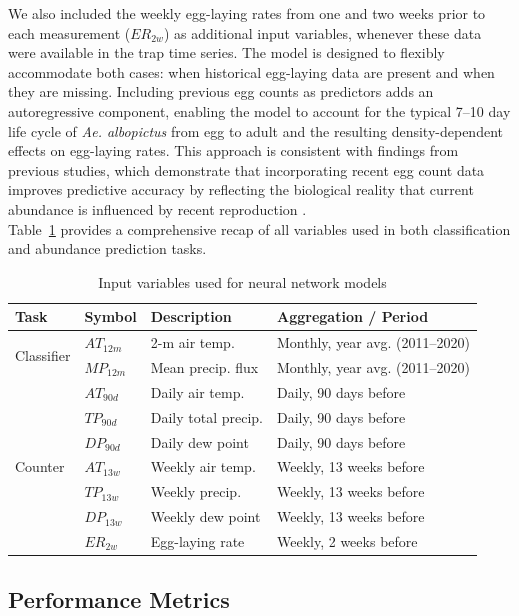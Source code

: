 \documentclass[preprint,12pt]{elsarticle}
\begin{document}
We also included the weekly egg-laying rates from one and two weeks prior to each measurement ($ER_{2w}$) as additional input variables, whenever these data were available in the trap time series. The model is designed to flexibly accommodate both cases: when historical egg-laying data are present and when they are missing. Including previous egg counts as predictors adds an autoregressive component, enabling the model to account for the typical 7–10 day life cycle of \emph{Ae. albopictus} from egg to adult \cite{CDC} and the resulting density-dependent effects on egg-laying rates. This approach is consistent with findings from previous studies, which demonstrate that incorporating recent egg count data improves predictive accuracy by reflecting the biological reality that current abundance is influenced by recent reproduction \cite{Steindorf2025}.\\
Table~\ref{tab:inputs_var} provides a comprehensive recap of all variables used in both classification and abundance prediction tasks.
\begin{table}[ht]
\centering
\begin{tabular}{|l|l|p{3cm}|p{6cm}|}
\hline
\textbf{Task} & \textbf{Symbol} & \textbf{Description} & \textbf{Aggregation / Period} \\
\hline
\multirow{2}{*}{Classifier} 
  & $AT_{12m}$    & 2-m air temp.    & Monthly, year avg. (2011--2020) \\
  & $MP_{12m}$  & Mean precip. flux & Monthly, year avg. (2011--2020) \\
\hline
\multirow{7}{*}{Counter} 
  & $AT_{90d}$     & Daily air temp.  & Daily, 90 days before \\
  & $TP_{90d}$    & Daily total precip. & Daily, 90 days before \\
  & $DP_{90d}$     & Daily dew point   & Daily, 90 days before \\
  & $AT_{13w}$     & Weekly air temp.  & Weekly, 13 weeks before \\
  & $TP_{13w}$      & Weekly precip.    & Weekly, 13 weeks before \\
  & $DP_{13w}$     & Weekly dew point  & Weekly, 13 weeks before \\
  & $ER_{2w}$     & Egg-laying rate   & Weekly, 2 weeks before\\
\hline
\end{tabular}
\caption{Input variables used for neural network models}
\label{tab:inputs_var}
\end{table}

\subsection{Performance Metrics}
\end{document}
